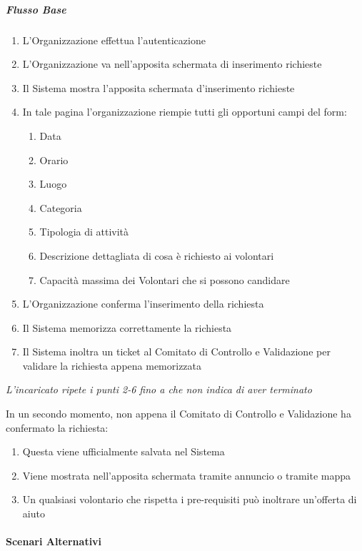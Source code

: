 \subparagraph{Flusso Base}
\begin{enumerate}
    \item L'Organizzazione effettua l'autenticazione
    \item L'Organizzazione va nell'apposita schermata di inserimento richieste
    \item Il Sistema mostra l'apposita schermata d'inserimento richieste
    \item In tale pagina l'organizzazione riempie tutti gli opportuni campi del form:
    \begin{enumerate}
        \item Data
        \item Orario
        \item Luogo
        \item Categoria
        \item Tipologia di attività
        \item Descrizione dettagliata di cosa è richiesto ai volontari
        \item Capacità massima dei Volontari che si possono candidare
    \end{enumerate}
    \item L'Organizzazione conferma l'inserimento della richiesta
    \item Il Sistema memorizza correttamente la richiesta
    \item Il Sistema inoltra un ticket al Comitato di Controllo e Validazione per validare la richiesta appena memorizzata
\end{enumerate}

\textit{L'incaricato ripete i punti 2-6 fino a che non indica di aver terminato}

In un secondo momento, non appena il Comitato di Controllo e Validazione ha confermato la richiesta:
\begin{enumerate}
    \item Questa viene ufficialmente salvata nel Sistema
    \item Viene mostrata nell'apposita schermata tramite annuncio o tramite mappa
    \item Un qualsiasi volontario che rispetta i pre-requisiti può inoltrare un'offerta di aiuto
\end{enumerate}

\paragraph{Scenari Alternativi}


